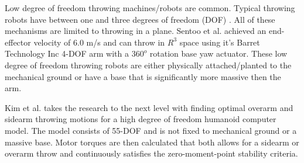 
Low degree of freedom throwing machines/robots are common.  Typical throwing robots have between one and three degrees of freedom (DOF) \cite{509405, Lynch97dynamicnonprehensile, 5152525, 509335, springerlink:10.1007/s10015-006-0401-0}.  All of these mechanisms are limited to throwing in a plane.   Sentoo et al.\cite{4651142} achieved an end-effector velocity of 6.0 m/s and can throw in $R^3$ space using it's Barret Technology Inc 4-DOF arm with a $360^o$ rotation base yaw actuator.  These low degree of freedom throwing robots are either physically attached/planted to the mechanical ground or have a base that is significantly more massive then the arm.  

Kim et al. \cite{JooH2011438} takes the research to the next level with finding optimal overarm and sidearm throwing motions for a high degree of freedom humanoid computer model.  The model consists of 55-DOF and is not fixed to mechanical ground or a massive base.  Motor torques are then calculated that both allows for a sidearm or overarm throw and continuously satisfies the zero-moment-point stability criteria\cite{4309277}.  




